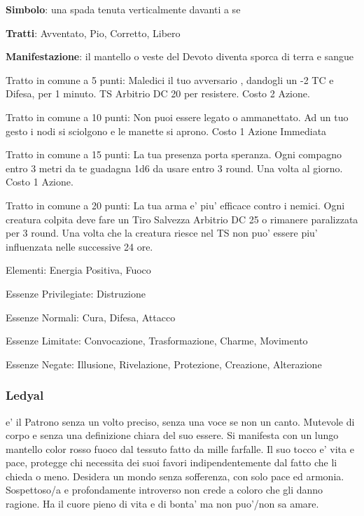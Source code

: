 \documentclass[a4paper,11pt,twoside,openany]{book}
\begin{document}
{\textbf{Simbolo}: una spada tenuta verticalmente davanti a se

\textbf{Tratti}: Avventato, Pio, Corretto, Libero

\textbf{Manifestazione}: il mantello o veste del Devoto diventa sporca
di terra e sangue

\bigskip

Tratto in comune a 5 punti: Maledici il tuo avversario , dandogli un -2 TC e Difesa, per 1 minuto. TS Arbitrio DC 20 per resistere. Costo 2 Azione.

Tratto in comune a 10 punti: Non puoi essere legato o ammanettato. Ad un tuo gesto i nodi si sciolgono e le manette si aprono. Costo 1 Azione Immediata

Tratto in comune a 15 punti: La tua presenza porta speranza. Ogni compagno entro 3 metri da te guadagna 1d6 da usare entro 3 round. Una volta al giorno. Costo 1 Azione.

Tratto in comune a 20 punti: La tua arma e' piu' efficace contro i nemici. Ogni creatura colpita deve fare un Tiro Salvezza Arbitrio DC 25 o rimanere paralizzata per 3 round. Una volta che la creatura riesce nel TS non puo' essere piu' influenzata nelle successive 24 ore.

\bigskip

Elementi: Energia Positiva, Fuoco

\bigskip

Essenze Privilegiate: Distruzione

Essenze Normali: Cura, Difesa, Attacco

Essenze Limitate: Convocazione, Trasformazione, Charme, Movimento

Essenze Negate: Illusione, Rivelazione, Protezione, Creazione, Alterazione

\subsubsection{Ledyal}

\label{ledyal}

e' il Patrono senza un volto preciso, senza una voce se non un canto. Mutevole di corpo e senza una definizione chiara del suo essere. Si manifesta con un lungo mantello color rosso fuoco dal tessuto fatto da mille farfalle. Il suo tocco e' vita e pace, protegge chi necessita dei suoi favori indipendentemente dal fatto che li chieda o meno. Desidera un mondo senza sofferenza, con solo pace ed armonia. Sospettoso/a e profondamente introverso non crede a coloro che gli danno ragione. Ha il cuore pieno di vita e di bonta' ma non puo'/non sa amare.

}
\end{document}

